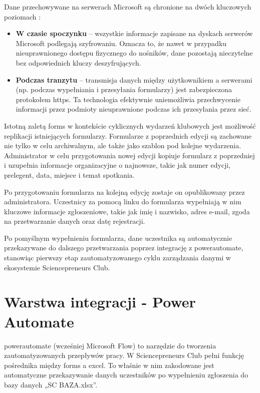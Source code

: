 Dane przechowywane na serwerach Microsoft są chronione na dwóch kluczowych poziomach \cite{microsoft_encryption_2024}:
\begin{itemize}
    \item \textbf{W czasie spoczynku} – wszystkie informacje zapisane na dyskach serwerów Microsoft podlegają szyfrowaniu. Oznacza to, że nawet w przypadku nieuprawnionego dostępu fizycznego do nośników, dane pozostają nieczytelne bez odpowiednich kluczy deszyfrujących.
    \item \textbf{Podczas tranzytu} – transmisja danych między użytkownikiem a serwerami (np. podczas wypełniania i przesyłania formularzy) jest zabezpieczona protokołem \gls{https}. Ta technologia efektywnie uniemożliwia przechwycenie informacji przez podmioty nieuprawnione podczas ich przesyłania przez sieć.
\end{itemize}

Istotną zaletą \gls{forms} w kontekście cyklicznych wydarzeń klubowych jest możliwość replikacji istniejących formularzy. Formularze z poprzednich edycji są zachowane nie tylko w celu archiwalnym, ale także jako szablon pod kolejne wydarzenia. Administrator w celu przygotowania nowej edycji kopiuje formularz z poprzedniej i uzupełnia informacje organizacyjne o najnowsze, takie jak numer edycji, prelegent, data, miejsce i temat spotkania. 

Po przygotowaniu formularza na kolejną edycję zostaje on opublikowany przez administratora. Uczestnicy za pomocą linku do formularza  wypełniają w nim kluczowe informacje zgłoszeniowe, takie jak imię i nazwisko, adres e-mail, zgoda na przetwarzanie danych oraz datę rejestracji.

Po pomyślnym wypełnieniu formularza, dane uczestnika są automatycznie przekazywane do dalszego przetwarzania poprzez integrację z \gls{powerautomate}, stanowiąc pierwszy etap zautomatyzowanego cyklu zarządzania danymi w ekosystemie Sciencepreneurs Club.

\section{Warstwa integracji - Power Automate}

\gls{powerautomate} (wcześniej Microsoft Flow) to narzędzie do tworzenia zautomatyzowanych przepływów pracy. W Sciencepreneurs Club pełni funkcję pośrednika między \gls{forms} a \gls{excel}. To właśnie w nim zakodowane jest automatyczne przekazywanie danych uczestników po wypełnieniu zgłoszenia do bazy danych „SC BAZA.xlsx”. 

